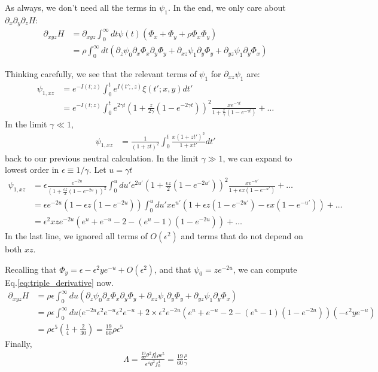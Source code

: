 \documentclass[aps,rmp,twocolumn,groupedaddress,floatfix,notitlepage]{revtex4-1}
\begin{document}
As always, we don't need all the terms in $\psi_1$. In the end, we only care about $\partial_x \partial_y \partial_z H$:
\begin{align}
    \partial_{xyz} H &= \partial_{xyz}\int_0^\infty dt \psi(t) (\Phi_x + \Phi_y + \rho \Phi_x \Phi_y) \\
    &= \rho \int_0^\infty dt (\partial_z \psi_0 \partial_x \Phi_x \partial_y \Phi_y
    + \partial_{xz} \psi_1 \partial_y \Phi_y + \partial_{yz} \psi_1 \partial_y \Phi_x)
    \label{eq:triple_derivative}
\end{align}

Thinking carefully, we see that the relevant terms of $\psi_1$ for $\partial_{xz}\psi_1$ are:
\begin{align}
    \psi_{1, xz} &= e^{-I(t; z)} \int_0^t e^{I(t';,z)}\xi(t'; x,y)dt' \\
    &= e^{-I(t; z)} \int_0^t e^{2\gamma t} (1+\frac{z}{2\gamma}(1-e^{-2\gamma t}))^2 
    \frac{x e^{-\gamma t}}{1 + \frac{x}{\gamma} (1-e^{-\gamma t})} + \ldots
\end{align}
In the limit $\gamma \ll 1$,
\begin{align}
    \psi_{1, xz} &= \frac{1}{(1+zt)^2} \int_0^t \frac{x(1+zt')^2}{1+xt'} dt'
\end{align}
back to our previous neutral calculation.
In the limit $\gamma\gg 1$, we can expand to lowest order in $\epsilon \equiv 1/\gamma$. Let $u=\gamma t$
\begin{align}
    \psi_{1, xz} &= \epsilon \frac{e^{-2u}}{(1+\frac{\epsilon z}{2}(1-e^{-2u}))^2}
    \int_0^u du' e^{2u'} (1+\frac{\epsilon z}{2}(1-e^{-2u'}))^2 \frac{x e^{-u'}}{1 + \epsilon x (1-e^{-u'})} + \ldots\\
    &=\epsilon e^{-2u}(1-\epsilon z(1-e^{-2u}))
    \int_0^u du' xe^{u'}(1+\epsilon z(1-e^{-2u'}) - \epsilon x(1-e^{-u'})) + \ldots\\
    &= \epsilon^2 xz e^{-2u}(e^u + e^{-u} - 2 - (e^u-1)(1-e^{-2u})) + \ldots
\end{align}
In the last line, we ignored all terms of $O(\epsilon^2)$ and terms that do not depend on both $xz$.

Recalling that $\Phi_y = \epsilon - \epsilon^2 ye^{-u} + O(\epsilon^2)$, and that $\psi_0=ze^{-2u}$, we can compute Eq.\ref{eq:triple_derivative} now.
\begin{align}
    \partial_{xyz}H &= \rho \epsilon \int_0^\infty du (\partial_z \psi_0 \partial_x \Phi_x \partial_y \Phi_y
    + \partial_{xz} \psi_1 \partial_y \Phi_y + \partial_{yz} \psi_1 \partial_y \Phi_x) \\
    &= \rho \epsilon \int_0^\infty du(e^{-2u} \epsilon^2 e^{-u} \epsilon^2 e^{-u} + 
    2 \times \epsilon^2 e^{-2u}(e^u + e^{-u} - 2 - (e^u-1)(1-e^{-2u})) (- \epsilon^2 ye^{-u})\\
    &= \rho \epsilon^5 (\frac{1}{4} + \frac{2}{30}) = \frac{19}{60} \rho \epsilon^5
\end{align}
Finally,
\begin{align}
    \Lambda = \frac{\frac{19}{60} \theta^2f_0^4 \rho \epsilon^5}{\epsilon^4 \theta^2 f_0^4}
    = \frac{19}{60} \frac{\rho}{\gamma}
\end{align}
\end{document}
